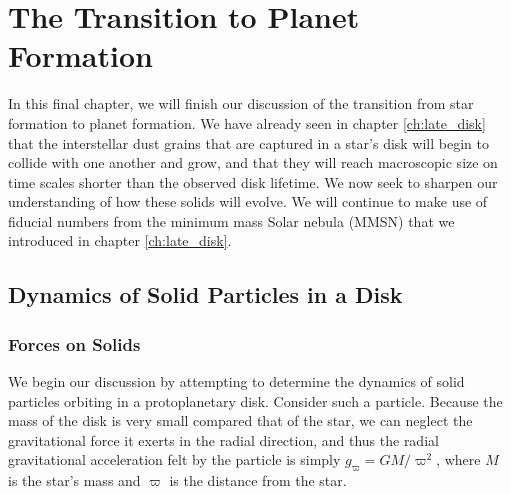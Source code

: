 \chapter{The Transition to Planet Formation}
\label{ch:planets}


In this final chapter, we will finish our discussion of the transition from star formation to planet formation. We have already seen in chapter \ref{ch:late_disk} that the interstellar dust grains that are captured in a star's disk will begin to collide with one another and grow, and that they will reach macroscopic size on time scales shorter than the observed disk lifetime. We now seek to sharpen our understanding of how these solids will evolve. We will continue to make use of fiducial numbers from the minimum mass Solar nebula (MMSN) that we introduced in chapter \ref{ch:late_disk}.

\section{Dynamics of Solid Particles in a Disk}

\subsection{Forces on Solids}

We begin our discussion by attempting to determine the dynamics of solid particles orbiting in a protoplanetary disk. Consider such a particle. Because the mass of the disk is very small compared that of the star, we can neglect the gravitational force it exerts in the radial direction, and thus the radial gravitational acceleration felt by the particle is simply $g_\varpi = G M/\varpi^2$, where $M$ is the star's mass and $\varpi$ is the distance from the star. 

